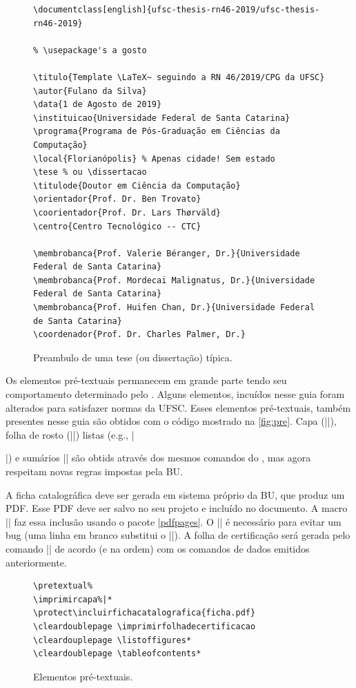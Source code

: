 \documentclass[english,embeddedlogo]{../ufsc-thesis-rn46-2019}
\begin{document}
\begin{figure}[tb]
  \centering
  \caption{Preambulo de uma tese (ou dissertação) típica.}
  \label{fig:preambulo}
  \begin{verbatim}
\documentclass[english]{ufsc-thesis-rn46-2019/ufsc-thesis-rn46-2019}

% \usepackage's a gosto

\titulo{Template \LaTeX~ seguindo a RN 46/2019/CPG da UFSC}
\autor{Fulano da Silva}
\data{1 de Agosto de 2019}
\instituicao{Universidade Federal de Santa Catarina}
\programa{Programa de Pós-Graduação em Ciências da Computação}
\local{Florianópolis} % Apenas cidade! Sem estado
\tese % ou \dissertacao
\titulode{Doutor em Ciência da Computação}
\orientador{Prof. Dr. Ben Trovato}
\coorientador{Prof. Dr. Lars Thørväld}
\centro{Centro Tecnológico -- CTC}

\membrobanca{Prof. Valerie Béranger, Dr.}{Universidade Federal de Santa Catarina}
\membrobanca{Prof. Mordecai Malignatus, Dr.}{Universidade Federal de Santa Catarina}
\membrobanca{Prof. Huifen Chan, Dr.}{Universidade Federal de Santa Catarina}
\coordenador{Prof. Dr. Charles Palmer, Dr.}
  \end{verbatim}
\end{figure}

Os elementos pré-textuais permanecem em grande parte tendo seu comportamento determinado pelo \abnTeX. Alguns elementos, incuídos nesse guia foram alterados para satisfazer normas da UFSC. Esses elementos pré-textuais, também presentes nesse guia são obtidos com o código mostrado na \autoref{fig:pre}. Capa (\mt|\imprimircapa|), folha de rosto (\mt|\imprimirfolhaderosto*|) listas (e.g., \mt|\listoffigures*|) e sumários \mt|\tableofcontents*| são obtids através dos mesmos comandos do \abnTeX, mas agora respeitam novas regras impostas pela BU. 

A ficha catalográfica deve ser gerada em sistema próprio da BU, que produz um PDF. Esse PDF deve ser salvo no seu projeto e incluído no documento. A macro \mt|| faz essa inclusão usando o pacote \href{https://www.ctan.org/pkg/pdfpages}{\mt|pdfpages|}. O \mt|\protect| é necessário para evitar um bug (uma linha em branco substitui o \mt|\protect|). A folha de certificação será gerada pelo comando \mt|\imprimirfolhadecertificacao| de acordo (e na ordem) com os comandos de dados emitidos anteriormente.

\begin{figure}[tb]
  \centering
  \caption{Elementos pré-textuais.}
  \label{fig:pre}
  \begin{verbatim}
\pretextual%
\imprimircapa%|*
\protect\incluirfichacatalografica{ficha.pdf}
\cleardoublepage \imprimirfolhadecertificacao
\cleardouplepage \listoffigures*
\cleardoublepage \tableofcontents*
  \end{verbatim}
\end{figure}
\end{document}

